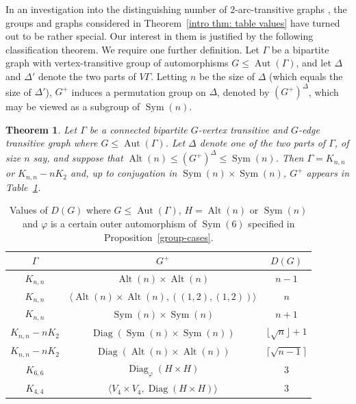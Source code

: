 \documentclass[11pt]{amsart}
\newtheorem{theorem}{Theorem}[section]
\DeclareMathOperator{\Sym}{Sym}
\DeclareMathOperator{\Alt}{Alt}
\DeclareMathOperator{\Aut}{Aut}
\DeclareMathOperator{\Diag}{Diag}
\begin{document}
In an investigation into the distinguishing number of $2$-arc-transitive graphs \cite{CDMR}, the groups and graphs considered in Theorem~\ref{intro thm: table values} have turned out to be rather special. Our interest in them is justified by the following classification theorem. We require one further definition. Let $\Gamma$ be a bipartite graph with vertex-transitive group of automorphisms $G\leqslant \Aut(\Gamma)$, and let $\Delta$ and $\Delta'$ denote the two parts of $V\Gamma$. Letting $n$ be the size of $\Delta$ (which equals the size of $\Delta'$), $G^+$ induces a permutation group on   $\Delta$, denoted by $(G^+)^{\Delta}$, which may be viewed as a subgroup of $\Sym(n)$.


\begin{theorem}
\label{main}
      Let $\Gamma$ be a connected bipartite $G$-vertex transitive and $G$-edge transitive graph where $G\leqslant \Aut(\Gamma)$. Let $\Delta$  denote one of the two parts of $\Gamma$, of size $n$ say, and suppose that
     $\Alt(n)\leqslant (G^+)^\Delta\leqslant \Sym(n)$.  Then $\Gamma=K_{n,n}$ or $K_{n,n}-nK_2$ and, up to conjugation in  $\Sym(n)\times \Sym(n)$, $G^+$ appears in Table~\ref{tab:main table}.
\end{theorem}






\begin{table}[h]
\centering
\begin{tabular}{|c|c|c|}
\hline
 $\Gamma$ &  $G^+$  & $D(G)$ \\  
\hline 
 $K_{n,n}$ & $\Alt(n)\times \Alt(n)$ &$n-1$ \\
 $K_{n,n}$ &$\langle \Alt(n)\times \Alt(n),((1,2),(1,2))\rangle$ & $n$ \\
 $K_{n,n}$ &$\Sym(n)\times \Sym(n)$ & $n+1$ \\
\hline
 $K_{n,n}-nK_2$ &$\Diag(\Sym(n)\times \Sym(n))$ & $\lfloor\sqrt{n} \rfloor+1$ \\
 $K_{n,n}-nK_2$ &$\Diag(\Alt(n)\times \Alt(n))$ & $\lceil\sqrt{n-1} \rceil$ \\
\hline
 $K_{6,6}$ & $\Diag_\varphi(H\times H)$ &$3$ \\
\hline
$K_{4,4}$ &$\langle V_4\times V_4,\Diag(H\times H)\rangle$ &  $3$ \\
\hline
\end{tabular}
\caption{Values of $D(G)$ where  $G \leqslant \Aut(\Gamma)$,   $H=\Alt(n)$ or $\Sym(n)$ and $\varphi$ is a certain outer automorphism of $\Sym(6)$ specified in Proposition~\ref{group-cases}.}
\label{tab:main table}
\end{table}
\end{document}
